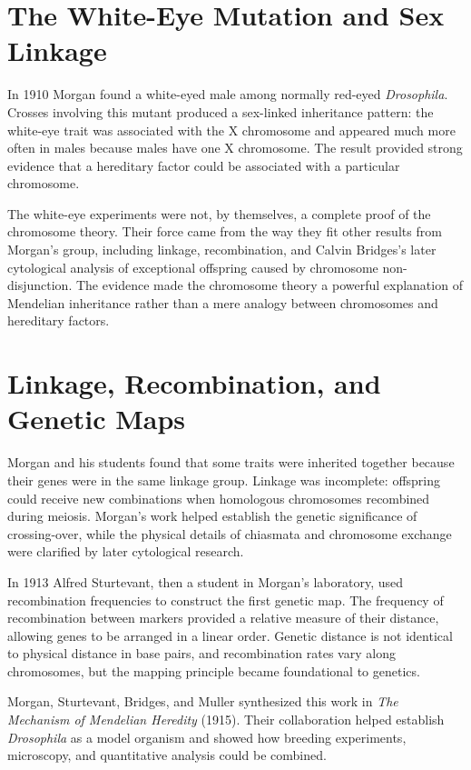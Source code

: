 \section{The White-Eye Mutation and Sex Linkage}

In 1910 Morgan found a white-eyed male among normally red-eyed \emph{Drosophila}. Crosses involving this mutant produced a sex-linked inheritance pattern: the white-eye trait was associated with the X chromosome and appeared much more often in males because males have one X chromosome. The result provided strong evidence that a hereditary factor could be associated with a particular chromosome.

The white-eye experiments were not, by themselves, a complete proof of the chromosome theory. Their force came from the way they fit other results from Morgan's group, including linkage, recombination, and Calvin Bridges's later cytological analysis of exceptional offspring caused by chromosome non-disjunction. The evidence made the chromosome theory a powerful explanation of Mendelian inheritance rather than a mere analogy between chromosomes and hereditary factors.

\section{Linkage, Recombination, and Genetic Maps}

Morgan and his students found that some traits were inherited together because their genes were in the same linkage group. Linkage was incomplete: offspring could receive new combinations when homologous chromosomes recombined during meiosis. Morgan's work helped establish the genetic significance of crossing-over, while the physical details of chiasmata and chromosome exchange were clarified by later cytological research.

In 1913 Alfred Sturtevant, then a student in Morgan's laboratory, used recombination frequencies to construct the first genetic map. The frequency of recombination between markers provided a relative measure of their distance, allowing genes to be arranged in a linear order. Genetic distance is not identical to physical distance in base pairs, and recombination rates vary along chromosomes, but the mapping principle became foundational to genetics.

Morgan, Sturtevant, Bridges, and Muller synthesized this work in \emph{The Mechanism of Mendelian Heredity} (1915). Their collaboration helped establish \emph{Drosophila} as a model organism and showed how breeding experiments, microscopy, and quantitative analysis could be combined.

